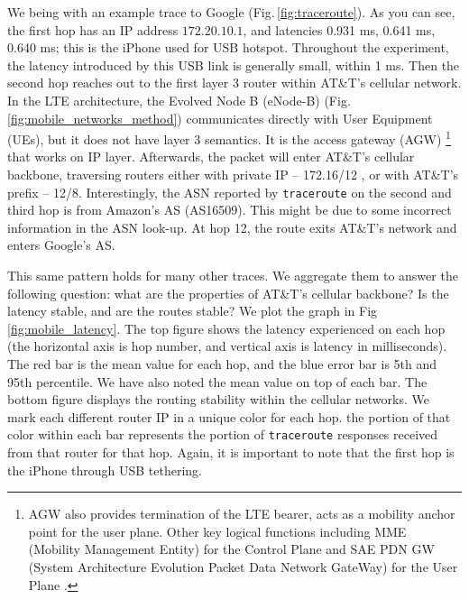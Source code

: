 We being with an example trace to Google (Fig.\,\ref{fig:traceroute}). As you can see, the first hop has an IP address $172.20.10.1$, and latencies 0.931 ms, 0.641 ms, 0.640 ms; this is the iPhone used for USB hotspot. Throughout the experiment, the latency introduced by this USB link is generally small, within 1 ms. Then the second hop reaches out to the first layer 3 router within AT\&T's cellular network. In the LTE architecture, the Evolved Node B (eNode-B) (Fig.\,\ref{fig:mobile_networks_method}) communicates directly with User Equipment (UEs), but it does not have layer 3 semantics. It is the access gateway (AGW) \footnote{AGW also provides termination of the LTE bearer, acts as a mobility anchor point for the user plane. Other key logical functions including MME (Mobility Management Entity) for the Control Plane and SAE PDN GW (System Architecture Evolution Packet Data Network GateWay) for the User Plane \cite{nortel}.} that works on IP layer. Afterwards, the packet will enter AT\&T's cellular backbone, traversing routers either with private IP -- 172.16/12 \cite{rekhterrfc}, or with AT\&T's prefix -- 12/8. Interestingly, the ASN reported by \texttt{traceroute} on the second and third hop is from Amazon's AS (AS16509). This might be due to some incorrect information in the ASN look-up. At hop 12, the route exits AT\&T's network and enters Google's AS.

This same pattern holds for many other traces. We aggregate them to answer the following question: what are the properties of AT\&T's cellular backbone? Is the latency stable, and are the routes stable? We plot the graph in Fig\,\ref{fig:mobile_latency}. The top figure shows the latency experienced on each hop (the horizontal axis is hop number, and vertical axis is latency in milliseconds). The red bar is the mean value for each hop, and the blue error bar is 5th and 95th percentile. We have also noted the mean value on top of each bar. The bottom figure displays the routing stability within the cellular networks. We mark each different router IP in a unique color for each hop. the portion of that color within each bar represents the portion of \texttt{traceroute} responses received from that router for that hop. Again, it is important to note that the first hop is the iPhone through USB tethering.

